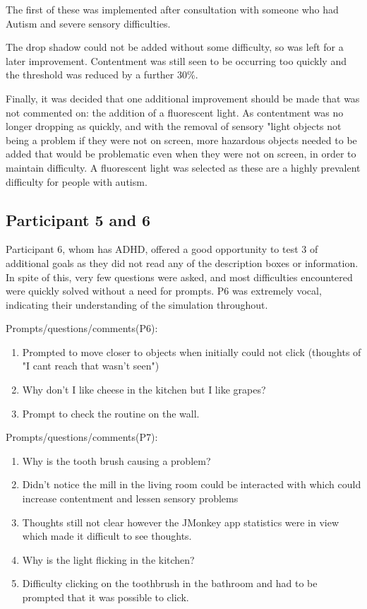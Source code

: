 \documentclass[11pt]{report}
\begin{document}
The first of these was implemented after consultation with someone who had Autism and severe sensory difficulties.

The drop shadow could not be added without some difficulty, so was left for a later improvement. Contentment was still seen to be occurring too quickly and the threshold was reduced by a further 30\%. 

Finally, it was decided that one additional improvement should be made that was not commented on: the addition of a fluorescent light. As contentment was no longer dropping as quickly, and with the removal of sensory "light objects not being a problem if they were not on screen, more hazardous objects needed to be added that would be problematic even when they were not on screen, in order to maintain difficulty. A fluorescent light was selected as these are a highly prevalent difficulty for people with autism. 

\subsection*{Participant 5 and 6}

Participant 6, whom has ADHD, offered a good opportunity to test 3 of additional goals as they did not read any of the description boxes or information. In spite of this, very few questions were asked, and most difficulties encountered were quickly solved without a need for prompts. P6 was extremely vocal, indicating their understanding of the simulation throughout.

Prompts/questions/comments(P6):
\begin{enumerate}
\item Prompted to move closer to objects when initially could not click (thoughts of "I cant reach that wasn't seen")
\item Why don't I like cheese in the kitchen but I like grapes?
\item Prompt to check the routine on the wall.
\end{enumerate}

Prompts/questions/comments(P7):
\begin{enumerate}
\item Why is the tooth brush causing a problem?
\item Didn't notice the mill in the living room could be interacted with which could increase contentment and lessen sensory problems
\item Thoughts still not clear however the JMonkey app statistics were in view which made it difficult to see thoughts.
\item Why is the light flicking in the kitchen?
\item Difficulty clicking on the toothbrush in the bathroom and had to be prompted that it was possible to click.
\end{enumerate}
\end{document}
